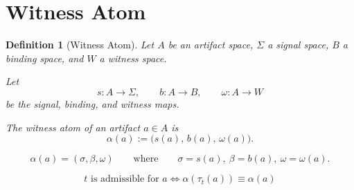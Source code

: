 \documentclass[11pt]{article}
\newtheorem{definition}{Definition}
\begin{document}
\section*{Witness Atom}

\begin{definition}[Witness Atom]
Let \(A\) be an artifact space, \(\Sigma\) a signal space, \(B\) a binding space, and \(W\) a witness space.

Let
\[
s : A \to \Sigma,
\qquad
b : A \to B,
\qquad
\omega : A \to W
\]
be the signal, binding, and witness maps.

The witness atom of an artifact \(a \in A\) is
\[
\alpha(a) := \bigl(s(a),\, b(a),\, \omega(a)\bigr).
\]
\end{definition}

\[
\boxed{
\alpha(a) = (\sigma,\beta,\omega)
}
\qquad
\text{where}
\qquad
\sigma=s(a),\ \beta=b(a),\ \omega=\omega(a).
\]

\[
\boxed{
t \text{ is admissible for } a
\iff
\alpha(\tau_t(a)) \equiv \alpha(a)
}
\]
\end{document}
